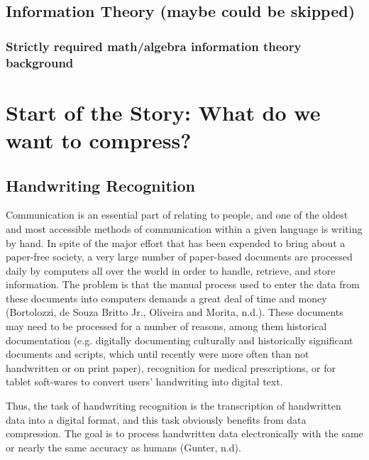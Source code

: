 \documentclass[12pt]{report}
\begin{document}
            
        
        \section{Information Theory (maybe could be skipped)}
        \subsection{Strictly required math/algebra information theory background}
    
    \chapter{Start of the Story: What do we want to compress?}
        \section{Handwriting Recognition}
            Communication is an essential part of relating to people, and one of the oldest and most accessible methods of communication within a given language is writing by hand. In spite of the major effort that has been expended to bring about a paper-free society, a very large number of paper-based documents are processed daily by computers all over the world in order to handle, retrieve, and store information. The problem is that the manual process used to enter the data from these documents into computers demands a great deal of time and money (Bortolozzi, de Souza Britto Jr., Oliveira and Morita, n.d.). These documents may need to be processed for a number of reasons, among them historical documentation (e.g. digitally documenting culturally and historically significant documents and scripts, which until recently were more often than not handwritten or on print paper), recognition for medical prescriptions, or for tablet soft-wares to convert users’ handwriting into digital text.
        
            Thus, the task of handwriting recognition is the transcription of handwritten data into a digital format, and this task obviously benefits from data compression. The goal is to process handwritten data electronically with the same or nearly the same accuracy as humans (Gunter, n.d).
            
\end{document}
